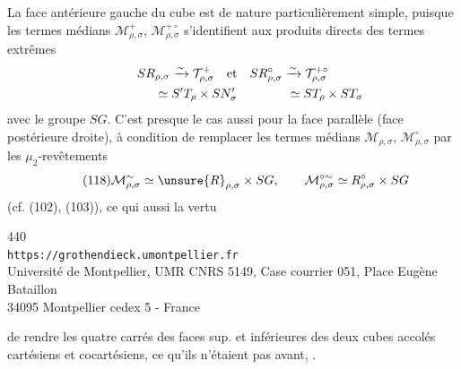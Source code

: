 La face  antérieure gauche du cube est de nature particulièrement simple, puisque les termes médians $\mathcal M_{\rho,\sigma}^{+}$, $\mathcal M_{\rho,\sigma}^{+\circ}$ s'identifient  aux produits directs des termes extrêmes
\[
\begin{gathered}
SR_{\rho,\sigma}\xrightarrow{\sim}\mathcal T_{\rho,\sigma}^{+}
\quad\text{et}\quad
SR_{\rho,\sigma}^{\circ}\xrightarrow{\sim}\mathcal T_{\rho,\sigma}^{+\circ}\\
\hphantom{SR_{\rho,\sigma}\xrightarrow{\sim}}\simeq S'T_\rho\times SN'_\sigma
\qquad\qquad\simeq ST_\rho\times ST_\sigma
\end{gathered}
\]
avec le groupe $SG$. C'est presque le cas aussi pour la face parallèle (face postérieure droite),  à condition de remplacer les  termes médians $\mathcal M_{\rho,\sigma}$, $\mathcal M_{\rho,\sigma}^{\circ}$ par les $\mu_2$-revêtements
\[
\tag{118}
\mathcal M_{\rho,\sigma}^{\sim}\simeq\unsure{R}_{\rho,\sigma}\times SG,
\qquad \mathcal M_{\rho,\sigma}^{\circ\sim}\simeq R_{\rho,\sigma}^{\circ}\times SG
\]
(cf. (102), (103)), ce qui  aussi la vertu


\begin{center}
{\small
440\\
\texttt{https://grothendieck.umontpellier.fr}\\
Université de Montpellier, UMR CNRS 5149, Case courrier 051, Place Eugène Bataillon\\
34095 Montpellier cedex 5 - France
}
\end{center}


 de rendre les quatre carrés des faces sup. et inférieures des deux cubes accolés cartésiens et cocartésiens, ce qu'ils n'étaient pas avant, .

